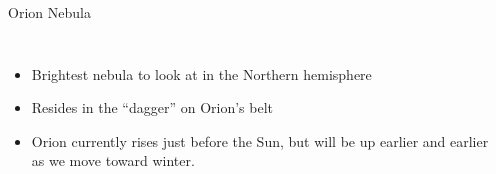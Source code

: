\documentclass[pdf, ]{beamer}
\begin{document}
\begin{frame}{Orion Nebula}
	\begin{columns}
		\begin{itemize}
			\item Brightest nebula to look at in the Northern hemisphere
			\item Resides in the ``dagger'' on Orion's belt
			\item Orion currently rises just before the Sun, but will be up earlier and earlier as we move toward winter.
		\end{itemize}
		\begin{center}
\end{center}
\end{columns}
\end{frame}
\end{document}
